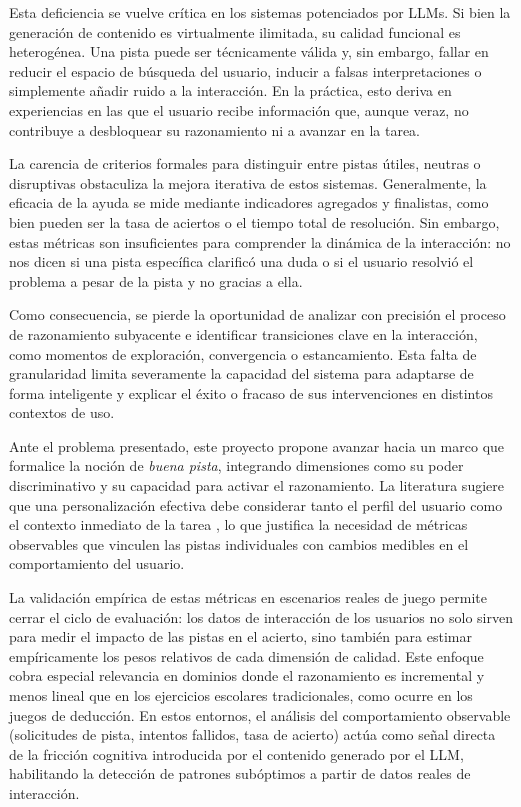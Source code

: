 \documentclass[../main.tex]{subfiles}
\begin{document}
Esta deficiencia se vuelve crítica en los sistemas potenciados por LLMs. Si bien la generación de contenido es virtualmente ilimitada, su calidad funcional es heterogénea. Una pista puede ser técnicamente válida y, sin embargo, fallar en reducir el espacio de búsqueda del usuario, inducir a falsas interpretaciones o simplemente añadir ruido a la interacción. En la práctica, esto deriva en experiencias en las que el usuario recibe información que, aunque veraz, no contribuye a desbloquear su razonamiento ni a avanzar en la tarea.

La carencia de criterios formales para distinguir entre pistas útiles, neutras o disruptivas obstaculiza la mejora iterativa de estos sistemas. Generalmente, la eficacia de la ayuda se mide mediante indicadores agregados y finalistas, como bien pueden ser la tasa de aciertos o el tiempo total de resolución. Sin embargo, estas métricas son insuficientes para comprender la dinámica de la interacción: no nos dicen si una pista específica clarificó una duda o si el usuario resolvió el problema a pesar de la pista y no gracias a ella.

Como consecuencia, se pierde la oportunidad de analizar con precisión el proceso de razonamiento subyacente e identificar transiciones clave en la interacción, como momentos de exploración, convergencia o estancamiento. Esta falta de granularidad limita severamente la capacidad del sistema para adaptarse de forma inteligente y explicar el éxito o fracaso de sus intervenciones en distintos contextos de uso.

Ante el problema presentado, este proyecto propone avanzar hacia un marco que formalice la noción de \textit{buena pista}, integrando dimensiones como su poder discriminativo y su capacidad para activar el razonamiento. La literatura sugiere que una personalización efectiva debe considerar tanto el perfil del usuario como el contexto inmediato de la tarea \cite{ITSAdaptation}, lo que justifica la necesidad de métricas observables que vinculen las pistas individuales con cambios medibles en el comportamiento del usuario.

La validación empírica de estas métricas en escenarios reales de juego permite cerrar el ciclo de evaluación: los datos de interacción de los usuarios no solo sirven para medir el impacto de las pistas en el acierto, sino también para estimar empíricamente los pesos relativos de cada dimensión de calidad. Este enfoque cobra especial relevancia en dominios donde el razonamiento es incremental y menos lineal que en los ejercicios escolares tradicionales, como ocurre en los juegos de deducción. En estos entornos, el análisis del comportamiento observable (solicitudes de pista, intentos fallidos, tasa de acierto) actúa como señal directa de la fricción cognitiva introducida por el contenido generado por el LLM, habilitando la detección de patrones subóptimos a partir de datos reales de interacción.
\end{document}
